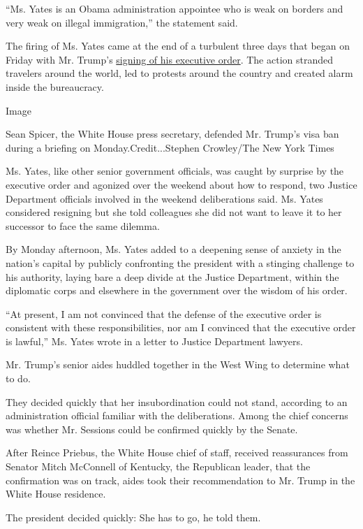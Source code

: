 ``Ms. Yates is an Obama administration appointee who is weak on borders
and very weak on illegal immigration,'' the statement said.

The firing of Ms. Yates came at the end of a turbulent three days that
began on Friday with Mr. Trump's
\href{https://www.nytimes.com/2017/01/27/us/politics/refugee-muslim-executive-order-trump.html?_r=0}{signing
of his executive order}. The action stranded travelers around the world,
led to protests around the country and created alarm inside the
bureaucracy.

Image

Sean Spicer, the White House press secretary, defended Mr. Trump's visa
ban during a briefing on Monday.Credit...Stephen Crowley/The New York
Times

Ms. Yates, like other senior government officials, was caught by
surprise by the executive order and agonized over the weekend about how
to respond, two Justice Department officials involved in the weekend
deliberations said. Ms. Yates considered resigning but she told
colleagues she did not want to leave it to her successor to face the
same dilemma.

By Monday afternoon, Ms. Yates added to a deepening sense of anxiety in
the nation's capital by publicly confronting the president with a
stinging challenge to his authority, laying bare a deep divide at the
Justice Department, within the diplomatic corps and elsewhere in the
government over the wisdom of his order.

``At present, I am not convinced that the defense of the executive order
is consistent with these responsibilities, nor am I convinced that the
executive order is lawful,'' Ms. Yates wrote in a letter to Justice
Department lawyers.

Mr. Trump's senior aides huddled together in the West Wing to determine
what to do.

They decided quickly that her insubordination could not stand, according
to an administration official familiar with the deliberations. Among the
chief concerns was whether Mr. Sessions could be confirmed quickly by
the Senate.

After Reince Priebus, the White House chief of staff, received
reassurances from Senator Mitch McConnell of Kentucky, the Republican
leader, that the confirmation was on track, aides took their
recommendation to Mr. Trump in the White House residence.

The president decided quickly: She has to go, he told them.

